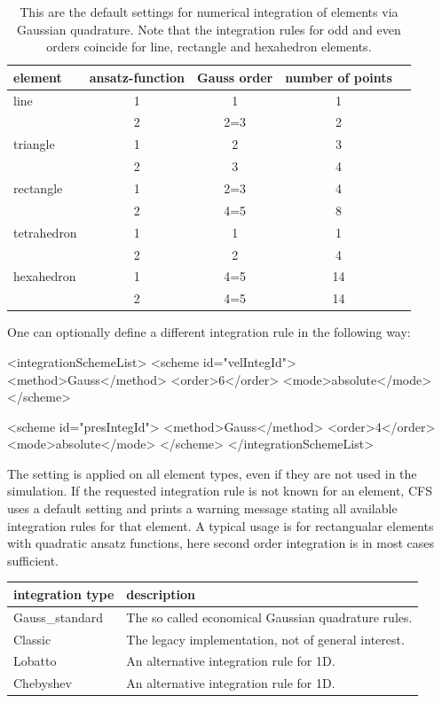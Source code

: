 \begin{table}[ht]
\begin{center}
\begin{tabular}{lcccc}
\toprule
element & ansatz-function & Gauss order & number of points \\
\midrule
line & 1 & 1 & 1\\
     & 2 & 2=3 & 2 \\
\midrule
triangle & 1 & 2 & 3 \\
         & 2 & 3 & 4 \\
\midrule
rectangle & 1 & 2=3 & 4 \\
          & 2 & 4=5 & 8 \\
\midrule
tetrahedron & 1 & 1 & 1 \\
         & 2 & 2 & 4 \\
\midrule
hexahedron & 1 & 4=5 & 14 \\
         & 2 & 4=5 & 14 \\
\bottomrule         
\end{tabular}
\caption{This are the default settings for numerical integration of elements via
Gaussian quadrature. Note that the integration rules for odd and even orders
coincide for line, rectangle and hexahedron elements.}
\label{tab:default_order}
\end{center}
\end{table}
% 
One can optionally define a different integration rule in the following way:
\begin{xmllisting}
  <integrationSchemeList>
    <scheme id="velIntegId">
      <method>Gauss</method>
      <order>6</order>
      <mode>absolute</mode>
    </scheme>
    
    <scheme id="presIntegId">
      <method>Gauss</method>
      <order>4</order>
      <mode>absolute</mode>
    </scheme>    
  </integrationSchemeList>  
\end{xmllisting}

The setting is applied on all element types, even if they are not used in the simulation. If the requested integration rule is not known for an element, CFS uses a default setting and prints a warning message stating all available integration rules for that element. A typical usage is for rectangualar elements with quadratic ansatz functions, here second order integration is in most cases sufficient.

\begin{center}
\begin{tabular}{ll}
\toprule
integration type & description \\
\midrule
Gauss\_standard & The so called economical Gaussian quadrature rules. \\
Classic & The legacy implementation, not of general interest. \\
Lobatto & An alternative integration rule for 1D. \\
Chebyshev & An alternative integration rule for 1D. \\
\bottomrule
\end{tabular}
\end{center}


